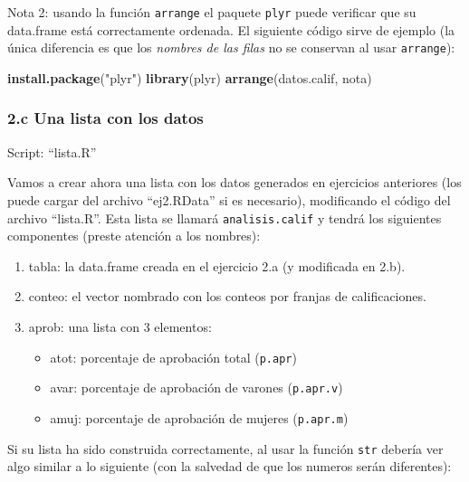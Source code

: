 \documentclass[]{article}
\newenvironment{Shaded}{}{}
\newcommand{\KeywordTok}[1]{\textcolor[rgb]{0.00,0.44,0.13}{\textbf{{#1}}}}
\newcommand{\StringTok}[1]{\textcolor[rgb]{0.25,0.44,0.63}{{#1}}}
\newcommand{\NormalTok}[1]{{#1}}
\begin{document}
Nota 2: usando la función \texttt{arrange} el paquete \texttt{plyr}
puede verificar que su data.frame está correctamente ordenada. El
siguiente código sirve de ejemplo (la única diferencia es que los
\emph{nombres de las filas} no se conservan al usar \texttt{arrange}):

\begin{Shaded}
\begin{Highlighting}[]
\KeywordTok{install.package}\NormalTok{(}\StringTok{"plyr"}\NormalTok{)}
\KeywordTok{library}\NormalTok{(plyr)}
\KeywordTok{arrange}\NormalTok{(datos.calif, nota)}
\end{Highlighting}
\end{Shaded}
\subsubsection{2.c Una lista con los datos}

Script: ``lista.R''

Vamos a crear ahora una lista con los datos generados en ejercicios
anteriores (los puede cargar del archivo ``ej2.RData'' si es necesario),
modificando el código del archivo ``lista.R''. Esta lista se llamará
\texttt{analisis.calif} y tendrá los siguientes componentes (preste
atención a los nombres):

\begin{enumerate}[1.]
\item
  tabla: la data.frame creada en el ejercicio 2.a (y modificada en 2.b).
\item
  conteo: el vector nombrado con los conteos por franjas de
  calificaciones.
\item
  aprob: una lista con 3 elementos:
  \begin{itemize}
  \item
    atot: porcentaje de aprobación total (\texttt{p.apr})
  \item
    avar: porcentaje de aprobación de varones (\texttt{p.apr.v})
  \item
    amuj: porcentaje de aprobación de mujeres (\texttt{p.apr.m})
  \end{itemize}
\end{enumerate}
Si su lista ha sido construida correctamente, al usar la función
\texttt{str} debería ver algo similar a lo siguiente (con la salvedad de
que los numeros serán diferentes):
\end{document}
